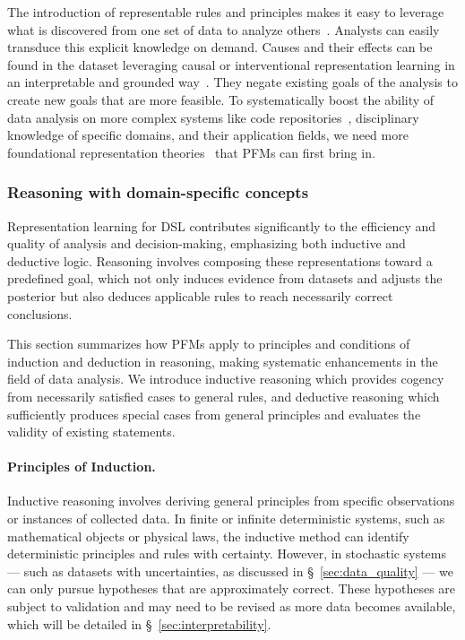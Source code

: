 The introduction of representable rules and principles makes it easy to leverage what is discovered from one set of data to analyze others~\cite{yuan2023power}. Analysts can easily transduce this explicit knowledge on demand. Causes and their effects can be found in the dataset leveraging causal or interventional representation learning in an interpretable and grounded way~\cite{ahuja2023interventional}. They negate existing goals of the analysis to create new goals that are more feasible. To systematically boost the ability of data analysis on more complex systems like code repositories~\cite{jain2024r2e}, disciplinary knowledge of specific domains, and their application fields, we need more foundational representation theories~\cite{yuan2023power} that PFMs can first bring in. 


\subsubsection{Reasoning with domain-specific concepts}\label{sec:reasoning}




Representation learning for DSL contributes significantly to the efficiency and quality of analysis and decision-making, emphasizing both inductive and deductive logic. Reasoning involves composing these representations toward a predefined goal, which not only induces evidence from datasets and adjusts the posterior but also deduces applicable rules to reach necessarily correct conclusions. 

This section summarizes how PFMs apply to principles and conditions of induction and deduction in reasoning, making systematic enhancements in the field of data analysis. We introduce inductive reasoning which provides cogency from necessarily satisfied cases to general rules, and deductive reasoning which sufficiently produces special cases from general principles and evaluates the validity of existing statements.

\paragraph{Principles of Induction.} Inductive reasoning involves deriving general principles from specific observations or instances of collected data. In finite or infinite deterministic systems, such as mathematical objects or physical laws, the inductive method can identify deterministic principles and rules with certainty. However, in stochastic systems — such as datasets with uncertainties, as discussed in \S~\ref{sec:data_quality} — we can only pursue hypotheses that are approximately correct. These hypotheses are subject to validation and may need to be revised as more data becomes available, which will be detailed in \S~\ref{sec:interpretability}.


